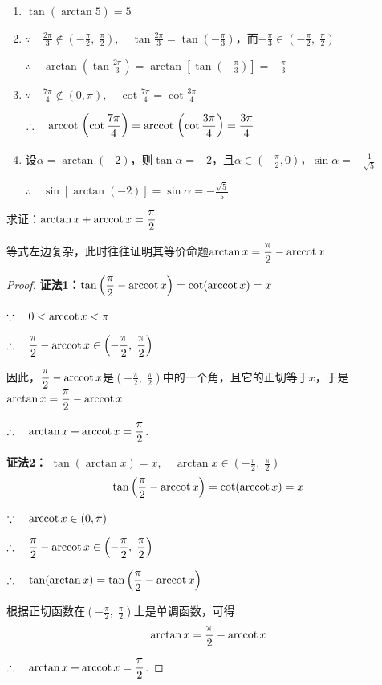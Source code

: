 \begin{solution}
\begin{enumerate}[(1)]
    \item $\tan(\arctan 5)=5$
    \item $\because\quad \frac{2\pi}{3}\notin \left(-\frac{\pi}{2},\; \frac{\pi}{2}\right),\quad \tan\frac{2\pi}{3}=\tan\left(-\frac{\pi}{3}\right)$，而$-\frac{\pi}{3}\in\left(-\frac{\pi}{2},\; \frac{\pi}{2}\right)$

$\therefore\quad \arctan\left(\tan\frac{2\pi}{3}\right)=\arctan \left[\tan\left(-\frac{\pi}{3}\right)\right]=-\frac{\pi}{3}$
    
\item $\because\quad \frac{7\pi}{4}\notin (0,\pi),\quad \cot\frac{7\pi}{4}=\cot\frac{3\pi}{4}$

$\therefore\quad {\rm arccot\,}\left(\cot\dfrac{7\pi}{4}\right)={\rm arccot\,}\left(\cot\dfrac{3\pi}{4}\right)=\dfrac{3\pi}{4}$

\item 设$\alpha=\arctan (-2)$，则$\tan\alpha=-2$，且$\alpha\in\left(-\frac{\pi}{2},0\right)$，$\sin\alpha=-\frac{1}{\sqrt{5}}$

$\therefore\quad \sin[\arctan(-2)]=\sin\alpha=-\frac{\sqrt{5}}{5}$
\end{enumerate}    
\end{solution}


\begin{example}
求证：$\arctan x+{\rm arccot\,} x=\dfrac{\pi}{2}$
\end{example}

\begin{analyze}
等式左边复杂，此时往往证明其等价命题$\arctan x=\dfrac{\pi}{2}-{\rm arccot\,} x$
\end{analyze}

\begin{proof}
\textbf{证法1：}$\tan\left(\dfrac{\pi}{2}-{\rm arccot\,} x\right)=\cot({\rm arccot\,} x)=x$

$\because\quad 0<{\rm arccot\,} x<\pi$

$\therefore\quad \dfrac{\pi}{2}-{\rm arccot\,} x\in\left(-\dfrac{\pi}{2},\; \dfrac{\pi}{2}\right)$

因此，$\dfrac{\pi}{2}-{\rm arccot\,} x$是$\left(-\frac{\pi}{2},\; \frac{\pi}{2}\right)$中的一个角，且它的正切等于$x$，于是$\arctan x=\dfrac{\pi}{2}-{\rm arccot\,} x$

$\therefore\quad \arctan x+  {\rm arccot\,} x=\dfrac{\pi}{2}$.

\textbf{证法2：} $\tan(\arctan x)=x,\quad \arctan x\in \left(-\frac{\pi}{2},\; \frac{\pi}{2}\right)$
\[\tan\left(\dfrac{\pi}{2}-{\rm arccot\,} x\right)=\cot({\rm arccot\,} x)=x\]

$\because\quad {\rm arccot\,} x\in(0,\pi)$

$\therefore\quad \dfrac{\pi}{2}-{\rm arccot\,} x \in \left(-\dfrac{\pi}{2},\; \dfrac{\pi}{2}\right)$

$\therefore\quad \tan(\arctan x)=\tan\left(\dfrac{\pi}{2}-{\rm arccot\,} x\right)$

根据正切函数在$\left(-\frac{\pi}{2},\; \frac{\pi}{2}\right)$上是单调函数，可得
\[\arctan x=\dfrac{\pi}{2}-{\rm arccot\,} x\]

$\therefore\quad \arctan x+  {\rm arccot\,} x=\dfrac{\pi}{2}$.
\end{proof}

